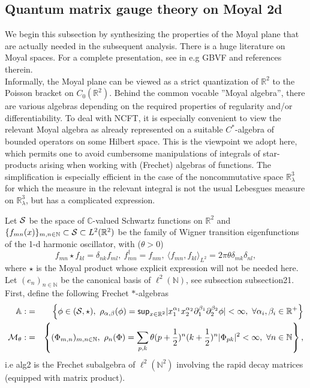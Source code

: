 \documentclass[10pt]{book}
\renewcommand{\sup}{\mathsf{sup}}
\theoremstyle{break}
\begin{document}

\subsection{Quantum matrix gauge theory on Moyal 2d}

We begin this subsection by synthesizing the properties of the Moyal plane that are actually needed in the subsequent analysis. There is a huge literature on Moyal spaces. For a complete presentation, see in e.g {GBVF} and references therein.\\
Informally, the Moyal plane can be viewed as a strict quantization of $\mathbb{R}^2$ to the Poisson bracket on $C_0(\mathbb{R}^2)$. Behind the common vocable ''Moyal algebra'', there are various algebras depending on the required properties of regularity and/or differentiability. To deal with NCFT, it is especially convenient to view the relevant Moyal algebra as already represented on a suitable $C^*$-algebra of bounded operators on some Hilbert space. This is the viewpoint we adopt here, which permits one to avoid cumbersome manipulations of integrals of star-products arising when working with (Frechet) algebras of functions. The simplification is especially efficient in the case of the noncommutative space $\mathbb{R}^3_\lambda$ for which the measure in the relevant integral is not the usual Lebesgues measure on $\mathbb{R}^3_\lambda$, but has a complicated expression.\par

Let ${\cal{S}}$ be the space of $\mathbb{C}$-valued Schwartz functions on $\mathbb{R}^2$ and $\{f_{mn}(x) \}_{m,n\in\mathbb{N}}\subset{\cal{S}}\subset L^2(\mathbb{R}^2)$ be the family of Wigner transition eigenfunctions of the 1-d harmonic oscillator, with ($\theta>0$)
\begin{equation}
f_{mn}\star f_{kl}=\delta_{nk}f_{ml},\ f_{mn}^\dag=f_{nm},\ \langle f_{mn},f_{kl} \rangle_{L^2}=2\pi\theta\delta_{mk}\delta_{nl},
\end{equation}
where $\star$ is the Moyal product whose explicit expression will not be needed here. Let $(e_n)_{n\in\mathbb{N}}$ be the canonical basis of $\ell^2(\mathbb{N})$, see subsection {subsection21}. First, define the following Frechet $*$-algebras
\begin{eqnarray}
{\mathbb{A}}:&=&\left\{\phi\in({\cal{S}},\star),\ \rho_{\alpha,\beta}(\phi)=\sup_{x\in\mathbb{R}^2}|x_1^{\alpha_1}x_2^{\alpha_2}\partial_1^{\beta_1}\partial_2^{\beta_2}\phi|<\infty,\ \forall \alpha_i,\beta_i\in\mathbb{R}^+ \right\}\\
{\cal{M}}_\theta:&=&\left\{(\Phi_{m,n})_{m,n\in\mathbb{N}},\ \rho_n(\Phi)=\sum_{p,k}\theta(p+\frac{1}{2})^n(k+\frac{1}{2})^n|\Phi_{pk}|^2<\infty,\ \forall n\in\mathbb{N}\right\},
\end{eqnarray}
i.e alg2 is the Frechet subalgebra of $\ell^2(\mathbb{N}^2)$ involving the rapid decay matrices (equipped with matrix product).
\end{document}
